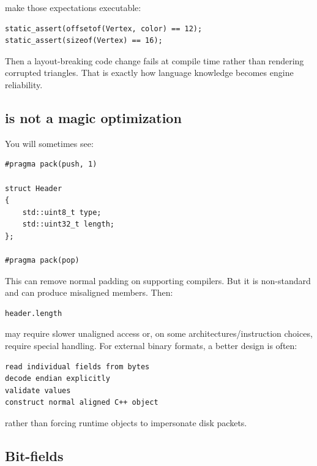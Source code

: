 make those expectations executable:

\begin{verbatim}
static_assert(offsetof(Vertex, color) == 12);
static_assert(sizeof(Vertex) == 16);
\end{verbatim}

Then a layout-breaking code change fails at compile time rather than rendering corrupted triangles. That is exactly how language knowledge becomes engine reliability.

\subsection{\texorpdfstring{ is not a magic optimization}{\#pragmapack is not a magic optimization}}\label{01-foundations-i-ch003-pragma-pack-is-not-a-magic-optimization}

\hypertarget{01-foundations-i-ch003-pragma-pack-is-not-a-magic-optimization}{}

You will sometimes see:

\begin{verbatim}
#pragma pack(push, 1)

struct Header
{
    std::uint8_t type;
    std::uint32_t length;
};

#pragma pack(pop)
\end{verbatim}

This can remove normal padding on supporting compilers. But it is non-standard and can produce misaligned members. Then:

\begin{verbatim}
header.length
\end{verbatim}

may require slower unaligned access or, on some architectures/instruction choices, require special handling. For external binary formats, a better design is often:

\begin{verbatim}
read individual fields from bytes
decode endian explicitly
validate values
construct normal aligned C++ object
\end{verbatim}

rather than forcing runtime objects to impersonate disk packets.

\subsection{Bit-fields}\label{01-foundations-i-ch003-bit-fields}

